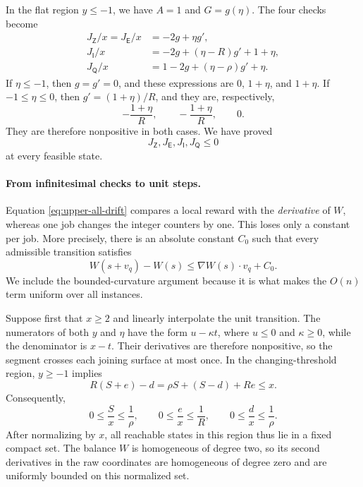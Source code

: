 In the flat region $y\le-1$, we have $A=1$ and $G=g(\eta)$.  The four checks
become
\begin{align}
 J_{\mathsf Z}/x=J_{\mathsf E}/x
   &=-2g+\eta g',\label{eq:upper-drift-flat-ZE}\\
 J_{\mathsf I}/x
   &=-2g+(\eta-R)g'+1+\eta,\label{eq:upper-drift-flat-I}\\
 J_{\mathsf Q}/x
   &=1-2g+(\eta-\rho)g'+\eta.\label{eq:upper-drift-flat-Q}
\end{align}
If $\eta\le-1$, then $g=g'=0$, and these expressions are $0$, $1+\eta$,
and $1+\eta$.  If $-1\le\eta\le0$, then $g'=(1+\eta)/R$, and they are,
respectively,
\[
 -\frac{1+\eta}{R},\qquad
 -\frac{1+\eta}{R},\qquad
 0.
\]
They are therefore nonpositive in both cases.  We have proved
\begin{equation}
\label{eq:upper-all-drift}
 J_{\mathsf Z},J_{\mathsf E},J_{\mathsf I},J_{\mathsf Q}\le0
\end{equation}
at every feasible state.

\paragraph{From infinitesimal checks to unit steps.}
Equation \eqref{eq:upper-all-drift} compares a local reward with the
\emph{derivative} of $W$, whereas one job changes the integer counters by one.
This loses only a constant per job.  More precisely, there is an absolute
constant $C_0$ such that every admissible transition satisfies
\begin{equation}
\label{eq:upper-Taylor}
 W(s+v_q)-W(s)\le \nabla W(s)\cdot v_q+C_0.
\end{equation}
We include the bounded-curvature argument because it is what makes the
$O(n)$ term uniform over all instances.

Suppose first that $x\ge2$ and linearly interpolate the unit transition.  The
numerators of both $y$ and $\eta$ have the form $u-\kappa t$, where $u\le0$
and $\kappa\ge0$, while the denominator is $x-t$.  Their derivatives are
therefore nonpositive, so the segment crosses each joining surface at most
once.  In the changing-threshold region, $y\ge-1$ implies
\[
 R(S+e)-d
   =\rho S+(S-d)+Re\le x.
\]
Consequently,
\[
 0\le \frac Sx\le\frac1\rho,
 \qquad
 0\le \frac ex\le\frac1R,
 \qquad
 0\le \frac dx\le\frac1\rho.
\]
After normalizing by $x$, all reachable states in this region thus lie in a
fixed compact set.  The balance $W$ is homogeneous of degree two, so its
second derivatives in the raw coordinates are homogeneous of degree zero and
are uniformly bounded on this normalized set.

